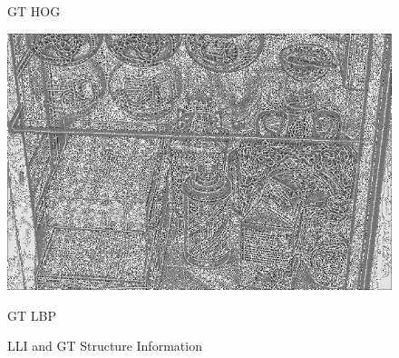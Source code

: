\documentclass[CJK,aspectratio=169]{beamer}  %
\begin{document}
\begin{frame}
\begin{figure}
\begin{minipage}{.19\textwidth}
				\captionsetup{font=scriptsize}
				\label{fig: GT_hog}	
				\caption*{GT HOG}
			\end{minipage}
			\begin{minipage}{.19\textwidth}
				\centering
				\includegraphics[width=.8\linewidth]{picture/LLIE/My Architecture/Edge Detection/normal00044_lbp}
				\captionsetup{font=scriptsize}
				\label{fig: GT_lbp}	
				\caption*{GT LBP}
			\end{minipage}
			\captionsetup{font=scriptsize}
			\caption{
				\label{fig: LLI Structure Information}
				LLI and GT Structure Information
			}
		\end{figure}
	\end{frame}
	
\end{document}

